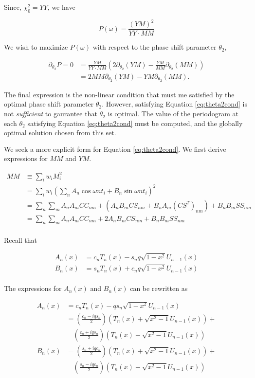 \documentclass[apj]{emulateapj}
\begin{document}
\begin{appendix}
Since, $\chi^2_0 = YY$, we have

\begin{equation}
P(\omega) = \frac{(YM)^2}{YY\cdot MM}
\end{equation}

We wish to maximize $P(\omega)$ with respect to the phase shift parameter $\theta_2$,

\begin{align}
\label{eq:theta2cond}
\partial_{\theta_2}P = 0 &= \frac{YM}{YY\cdot MM}\left(2\partial_{\theta_2}(YM) - \frac{YM}{MM}\partial_{\theta_2}(MM)\right)\\
                         &= 2MM\partial_{\theta_2}(YM) - YM\partial_{\theta_2}(MM).
\end{align}

The final expression is the non-linear condition that must me satisfied by the optimal
phase shift parameter $\theta_2$. However, satisfying Equation \ref{eq:theta2cond}
is not \emph{sufficient} to gaurantee that $\theta_2$ is optimal. The value of the
periodogram at each $\theta_2$ satisfying Equation \ref{eq:theta2cond} must be computed,
and the globally optimal solution chosen from this set.

We seek a more explicit form for Equation \ref{eq:theta2cond}. We first
derive expressions for $MM$ and $YM$.

\begin{align}
MM &\equiv \sum_i w_i M_i^2\\
   &= \sum_i w_i \left(\sum_nA_n\cos{\omega n t_i} + B_n\sin{\omega n t_i}\right)^2\\
   &= \sum_n \sum_m A_nA_mCC_{nm} + (A_nB_mCS_{nm} + B_nA_m(CS^T)_{nm}) + B_nB_mSS_{nm}\\
   &= \sum_n \sum_m A_nA_mCC_{nm} + 2A_nB_mCS_{nm} + B_nB_mSS_{nm}\\
\end{align}


Recall that

\begin{align}
A_n(x) &= c_n T_n(x) - s_nq\sqrt{1-x^2}U_{n-1}(x)\\
B_n(x) &= s_n T_n(x) + c_nq\sqrt{1-x^2}U_{n-1}(x)\\
\end{align}

The expressions for $A_n(x)$ and $B_n(x)$ can be rewritten as

\begin{align}
A_n(x) &= c_nT_n(x) - qs_n\sqrt{1-x^2}U_{n-1}(x)\\
       &= \left(\frac{c_n - iqs_n}{2}\right)\left(T_n(x) + \sqrt{x^2 - 1}U_{n-1}(x)\right) + \\
       &\quad \left(\frac{c_n + iqs_n}{2}\right)\left(T_n(x) - \sqrt{x^2 - 1}U_{n-1}(x)\right)\\
B_n(x) &=  \left(\frac{s_n + iqc_n}{2}\right)\left(T_n(x) + \sqrt{x^2 - 1}U_{n-1}(x)\right) + \\
       &\quad \left(\frac{s_n - iqc_n}{2}\right)\left(T_n(x) - \sqrt{x^2 - 1}U_{n-1}(x)\right)
\end{align}


\end{appendix}
\end{document}
